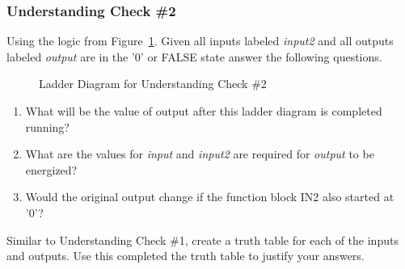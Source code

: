 \newpage
\subsubsection*{Understanding Check \#2}
Using the logic from Figure~\ref{fig:understanindCheck2}. Given all inputs labeled \textit{input2} and all outputs labeled \textit{output} are in the '0' or FALSE state answer the following questions.



\begin{figure}[!htb]
\begin{center}
\end{center}
\caption{Ladder Diagram for Understanding Check \#2}
\label{fig:understanindCheck2}
\end{figure}

\begin{enumerate}[noitemsep]
    \item What will be the value of output after this ladder diagram is completed running?
    \item What are the values for \textit{input} and \textit{input2} are required for \textit{output} to be energized?
    \item Would the original output change if the function block IN2 also started at '0'?
\end{enumerate}

Similar to Understanding Check \#1, create a truth table for each of the inputs and outputs. Use this completed the truth table to justify your answers.
